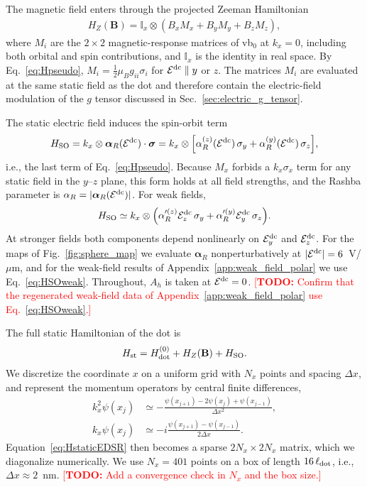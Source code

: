 \documentclass[
  aps,
  reprint,
  amsmath,
  amssymb,
  groupedaddress,
  floatfix,
  longbibliography,
]{revtex4-2}
\newcommand{\todo}[1]{\textcolor{red}{[\textbf{TODO:} #1]}}
\newcommand{\Edc}{\mathcal{E}^{\rm dc}}
\newcommand{\ldot}{\ell_{\rm dot}}
\begin{document}
The magnetic field enters through the projected Zeeman Hamiltonian
\begin{align}
H_Z(\mathbf{B})
=
\mathbb{I}_{x}
\otimes
\left(
B_x M_x + B_y M_y + B_z M_z
\right),
\label{eq:HZdot}
\end{align}
where $M_i$ are the $2\times2$ magnetic-response matrices of vb$_0$ at $k_x=0$, including both orbital and spin contributions, and $\mathbb{I}_{x}$ is the identity in real space. By Eq.~\eqref{eq:Hpseudo}, $M_i=\tfrac12\mu_B g_{ii}\sigma_i$ for $\Edc\parallel y$ or $z$. The matrices $M_i$ are evaluated at the same static field as the dot and therefore contain the electric-field modulation of the $g$ tensor discussed in Sec.~\ref{sec:electric_g_tensor}.

The static electric field induces the spin-orbit term
\begin{align}
H_{\rm SO}
=
k_x\otimes\bm{\alpha}_R(\Edc)\cdot\bm{\sigma}
=
k_x\otimes\Big[\alpha_R^{(z)}(\Edc)\,\sigma_y+\alpha_R^{(y)}(\Edc)\,\sigma_z\Big],
\label{eq:HSOdot}
\end{align}
i.e., the last term of Eq.~\eqref{eq:Hpseudo}. Because $M_x$ forbids a $k_x\sigma_x$ term for any static field in the $y$--$z$ plane, this form holds at all field strengths, and the Rashba parameter is $\alpha_R=|\bm{\alpha}_R(\Edc)|$. For weak fields,
\begin{align}
H_{\rm SO}\simeq k_x\otimes\Big(\alpha_R'^{(z)}\mathcal{E}^{\rm dc}_z\,\sigma_y+\alpha_R'^{(y)}\mathcal{E}^{\rm dc}_y\,\sigma_z\Big).
\label{eq:HSOweak}
\end{align}
At stronger fields both components depend nonlinearly on $\mathcal{E}^{\rm dc}_y$ and $\mathcal{E}^{\rm dc}_z$. For the maps of Fig.~\ref{fig:sphere_map} we evaluate $\bm{\alpha}_R$ nonperturbatively at $|\Edc|=6$~V/$\mu$m, and for the weak-field results of Appendix~\ref{app:weak_field_polar} we use Eq.~\eqref{eq:HSOweak}. Throughout, $A_h$ is taken at $\Edc=0$.
\todo{Confirm that the regenerated weak-field data of Appendix~\ref{app:weak_field_polar} use Eq.~\eqref{eq:HSOweak}.}

The full static Hamiltonian of the dot is
\begin{align}
H_{\rm st}
=
H_{\rm dot}^{(0)}
+
H_Z(\mathbf{B})
+
H_{\rm SO}.
\label{eq:HstaticEDSR}
\end{align}
We discretize the coordinate $x$ on a uniform grid with $N_x$ points and spacing $\Delta x$, and represent the momentum operators by central finite differences,
\begin{align}
k_x^2 \psi(x_j) & \simeq
-\frac{
\psi(x_{j+1}) - 2\psi(x_j) + \psi(x_{j-1})
}{\Delta x^2},
\\
k_x \psi(x_j)
&\simeq
-i
\frac{
\psi(x_{j+1})-\psi(x_{j-1})
}{2\Delta x}.
\end{align}
Equation~\eqref{eq:HstaticEDSR} then becomes a sparse $2N_x\times2N_x$ matrix, which we diagonalize numerically. We use $N_x=401$ points on a box of length $16\,\ldot$, i.e., $\Delta x\approx2$~nm.
\todo{Add a convergence check in $N_x$ and the box size.}
\end{document}
